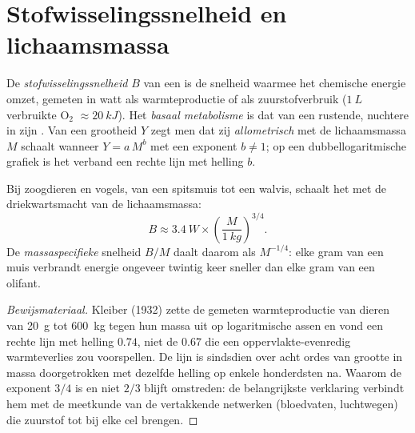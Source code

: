 \section{Stofwisselingssnelheid en lichaamsmassa}

\begin{definition}\label{def:b1:organism-environment:allometry}
De \emph{stofwisselingssnelheid} $B$ van een
 is de snelheid waarmee het chemische energie omzet, gemeten in watt
als warmteproductie of als zuurstofverbruik ($\qty{1}{L}$ verbruikte
$\mathrm{O_2}$ $\approx \qty{20}{kJ}$). Het \emph{basaal
metabolisme} is dat van een rustende, nuchtere
 in zijn . Van een grootheid $Y$ zegt men dat zij
\emph{allometrisch} met de lichaamsmassa $M$ schaalt wanneer
$Y = a\,M^{b}$ met een exponent $b \neq 1$; op een dubbellogaritmische grafiek
is het verband een rechte lijn met helling $b$.
\end{definition}

\begin{theorem}\label{thm:b1:organism-environment:kleiber}
Bij zoogdieren en vogels, van een spitsmuis tot een walvis, schaalt het
 met de driekwartsmacht van de lichaamsmassa:
\[
B \approx \qty{3.4}{W}\times\left(\frac{M}{\qty{1}{kg}}\right)^{3/4}.
\]
De \emph{massaspecifieke} snelheid $B/M$ daalt daarom als $M^{-1/4}$: elke
gram van een muis verbrandt energie ongeveer twintig keer sneller dan elke
gram van een olifant.
\end{theorem}
\begin{proof}[Bewijsmateriaal]
Kleiber (1932) zette de gemeten warmteproductie van dieren van \qty{20}{g}
tot \qty{600}{kg} tegen hun massa uit op logaritmische assen en vond een
rechte lijn met helling $0.74$, niet de $0.67$ die een oppervlakte-evenredig
warmteverlies zou voorspellen. De lijn is sindsdien over acht ordes van
grootte in massa doorgetrokken met dezelfde helling op enkele honderdsten na.
Waarom de exponent $3/4$ is en niet $2/3$ blijft omstreden: de belangrijkste
verklaring verbindt hem met de meetkunde van de vertakkende netwerken (bloedvaten,
luchtwegen) die zuurstof tot bij elke cel brengen.
\end{proof}

